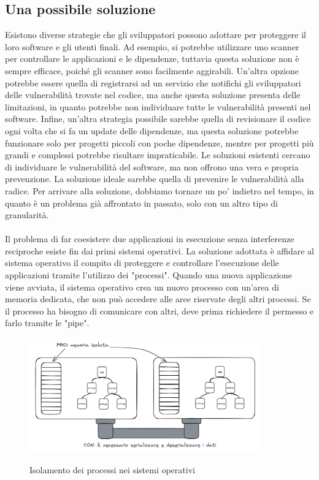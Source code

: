 \subsection{Una possibile soluzione}
Esistono diverse strategie che gli sviluppatori possono adottare per proteggere il loro software e gli utenti finali. Ad
esempio, si potrebbe utilizzare uno scanner per controllare le applicazioni e le dipendenze, tuttavia questa soluzione
non è sempre efficace, poiché gli scanner sono facilmente aggirabili. Un'altra opzione potrebbe essere quella di
registrarsi ad un servizio che notifichi gli sviluppatori delle vulnerabilità trovate nel codice, ma anche questa
soluzione presenta delle limitazioni, in quanto potrebbe non individuare tutte le vulnerabilità presenti nel software.
Infine, un'altra strategia possibile sarebbe quella di revisionare il codice ogni volta che si fa un update delle
dipendenze, ma questa soluzione potrebbe funzionare solo per progetti piccoli con poche dipendenze, mentre per progetti
più grandi e complessi potrebbe risultare impraticabile. Le soluzioni esistenti cercano di individuare le vulnerabilità
del software, ma non offrono una vera e propria prevenzione. La soluzione ideale sarebbe quella di prevenire le
vulnerabilità alla radice. Per arrivare alla soluzione, dobbiamo tornare un po' indietro nel tempo, in quanto è un
problema già affrontato in passato, solo con un altro tipo di granularità. \\
\\
Il problema di far coesistere due applicazioni in esecuzione senza interferenze reciproche esiste fin dai primi sistemi
operativi. La soluzione adottata è affidare al sistema operativo il compito di proteggere e controllare l'esecuzione
delle applicazioni tramite l'utilizzo dei "processi". Quando una nuova applicazione viene avviata, il sistema operativo
crea un nuovo processo con un'area di memoria dedicata, che non può accedere alle aree riservate degli altri processi.
Se il processo ha bisogno di comunicare con altri, deve prima richiedere il permesso e farlo tramite le "pipe".
\begin{figure}[h]
    \centering
    \captionsetup{justification=centering}
    \includegraphics[width=10cm]{./chapters/2.wasi-in-depth/images/2.process_isolation.png}
    \label{process_isolation}
    \caption{Isolamento dei processi nei sistemi operativi}
\end{figure}
